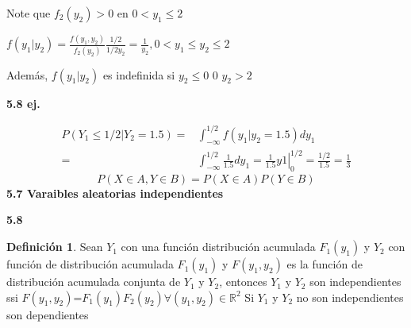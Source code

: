 \documentclass[12pt,letterpaper]{article}
\theoremstyle{definition}
\newtheorem{definition}{Definición}[section]
\begin{document}
Note que $f_2(y_2)>0$ en $0<y_1\leq 2$

$f(y_1|y_2)=\frac{f(y_1,y_2)}{f_2(y_2)}\frac{1/2}{1/2y_2}=\frac{1}{y_2}, 0<y_1\leq y_2 \leq 2$

Además, $f(y_1|y_2)$ es indefinida si $y_2\leq0$ 0 $y_2>2$

\textbf{5.8 ej.}

\[
\begin{array}{rl}
	P(Y_1\leq 1/2|Y_2 =1.5)=& \int^{1/2}_{-\infty} f(y_1|y_2=1.5)dy_1\\
	=& \int^{1/2}_{-\infty}\frac{1}{1.5}dy_1=\left.\frac{1}{1.5}y1\right|^{1/2}_0=\frac{1/2}{1.5}=\frac{1}{3}
\end{array}
\]
\[P(X\in A,Y\in B)=P(X\in A)P(Y\in B)\]
\textbf{5.7 Varaibles aleatorias independientes}

\textbf{5.8}
\begin{definition}
	Sean $Y_1$ con una función distribución acumulada $F_1(y_1)$ y $Y_2$ con función de distribución acumulada $F_1(y_1)$ y $F(y_1,y_2)$ es la función de distribución acumulada conjunta de $Y_1$ y $Y_2$, entonces $Y_1$ y $Y_2$ son independientes ssi $F(y_1,y_2)$=$F_1(y_1)F_2(y_2) \forall (y_1,y_2)\in \mathbb{R}^2$
Si $Y_1$ y $Y_2$ no son independientes son dependientes
\end{definition}
\end{document}

